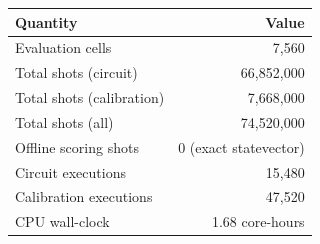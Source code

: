 \begin{tabular}{@{}lr@{}}
\toprule
Quantity & Value \\
\midrule
Evaluation cells & 7,560 \\
Total shots (circuit) & 66,852,000 \\
Total shots (calibration) & 7,668,000 \\
Total shots (all) & 74,520,000 \\
Offline scoring shots & 0 (exact statevector) \\
Circuit executions & 15,480 \\
Calibration executions & 47,520 \\
CPU wall-clock & 1.68 core-hours \\
\bottomrule
\end{tabular}
